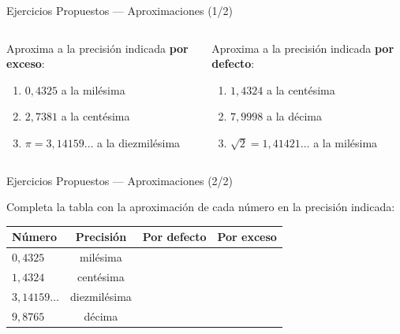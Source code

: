 \documentclass[aspectratio=169]{beamer}
\begin{document}
\begin{frame}{Ejercicios Propuestos — Aproximaciones \textnormal{(1/2)}}
  \begin{columns}[T]
    \begin{mwejercicio}
      Aproxima a la precisión indicada \textbf{por exceso}:
      \begin{enumerate}
        \item $0{,}4325$ a la milésima
        \item $2{,}7381$ a la centésima
        \item $\pi = 3{,}14159\dots$ a la diezmilésima
      \end{enumerate}
    \end{mwejercicio}
    \begin{mwejercicio}
      Aproxima a la precisión indicada \textbf{por defecto}:
      \begin{enumerate}
        \item $1{,}4324$ a la centésima
        \item $7{,}9998$ a la décima
        \item $\sqrt{2} = 1{,}41421\dots$ a la milésima
      \end{enumerate}
    \end{mwejercicio}
  \end{columns}
\end{frame}

\begin{frame}{Ejercicios Propuestos — Aproximaciones \textnormal{(2/2)}}
  \begin{mwejercicio}
    Completa la tabla con la aproximación de cada número en la
    precisión indicada:
    \vspace{4pt}

    \renewcommand{\arraystretch}{1.3}
    \begin{tabular}{@{} l c c c @{}}
      \toprule
      \textbf{Número} & \textbf{Precisión} & \textbf{Por defecto}
        & \textbf{Por exceso} \\
      \midrule
      $0{,}4325$ & milésima & & \\
      $1{,}4324$ & centésima & & \\
      $3{,}14159\dots$ & diezmilésima & & \\
      $9{,}8765$ & décima & & \\
      \bottomrule
    \end{tabular}
  \end{mwejercicio}
\end{frame}
\end{document}
